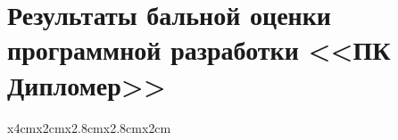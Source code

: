 \section{Результаты бальной оценки программной разработки <<ПК Дипломер>>}
\label{appendix:software_development_estimation}

\begin{longtable}{ x{4cm}x{2cm}x{2.8cm}x{2.8cm}x{2cm} }

	\caption {Результаты бальной оценки ПО по функциональным возможностям}\label{tab:functional_features_estimation}                                                                                      \\ \toprule
	\endfirsthead
	\caption* {Продолжение таблицы \ref{tab:functional_features_estimation}}                                                                                                                              \\ \toprule

	\endhead

	\endfoot

	\endlastfoot


\end{longtable}
